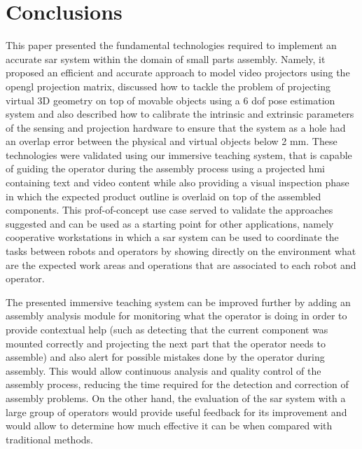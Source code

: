 \section{Conclusions}\label{sec:conclusions}

This paper presented the fundamental technologies required to implement an accurate \gls{sar} system within the domain of small parts assembly. Namely, it proposed an efficient and accurate approach to model video projectors using the \gls{opengl} projection matrix, discussed how to tackle the problem of projecting virtual 3D geometry on top of movable objects using a 6 \gls{dof} pose estimation system and also described how to calibrate the intrinsic and extrinsic parameters of the sensing and projection hardware to ensure that the system as a hole had an overlap error between the physical and virtual objects below 2 mm. These technologies were validated using our immersive teaching system, that is capable of guiding the operator during the assembly process using a projected \gls{hmi} containing text and video content while also providing a visual inspection phase in which the expected product outline is overlaid on top of the assembled components. This prof-of-concept use case served to validate the approaches suggested and can be used as a starting point for other applications, namely cooperative workstations in which a \gls{sar} system can be used to coordinate the tasks between robots and operators by showing directly on the environment what are the expected work areas and operations that are associated to each robot and operator.

The presented immersive teaching system can be improved further by adding an assembly analysis module for monitoring what the operator is doing in order to provide contextual help (such as detecting that the current component was mounted correctly and projecting the next part that the operator needs to assemble) and also alert for possible mistakes done by the operator during assembly. This would allow continuous analysis and quality control of the assembly process, reducing the time required for the detection and correction of assembly problems. On the other hand, the evaluation of the \gls{sar} system with a large group of operators would provide useful feedback for its improvement and would allow to determine how much effective it can be when compared with traditional methods.
